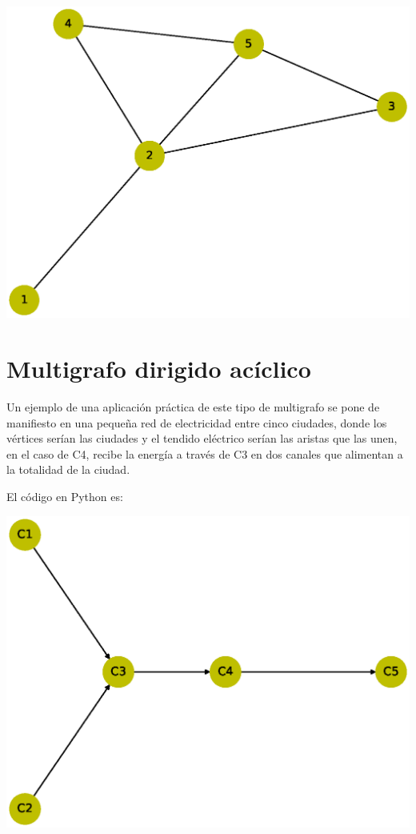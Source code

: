 \documentclass[10pt,a4paper]{article}
\begin{document}
\begin{center}

\includegraphics[scale=0.4]{MNDR}

\end{center}
 
\section{Multigrafo dirigido acíclico}

Un ejemplo de una aplicación práctica de este tipo de multigrafo se pone de manifiesto en una pequeña red de electricidad entre cinco ciudades, donde los vértices serían las ciudades y el tendido eléctrico serían las aristas que las unen, en el caso de C4, recibe la energía a través de C3 en dos canales que alimentan a la totalidad de la ciudad.\newpage

El código en Python es:



\begin{center}

\includegraphics[scale=0.4]{MDA}

\end{center}
\end{document}
